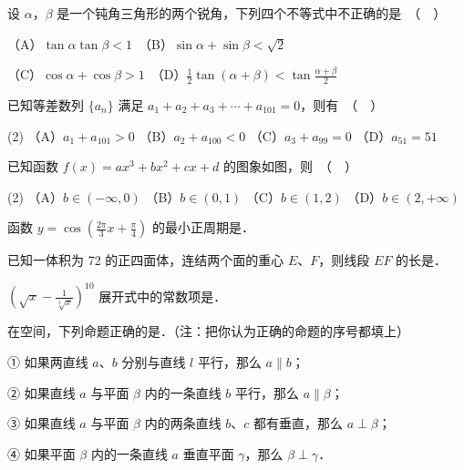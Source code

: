 \begin{question}
设 $\alpha$，$\beta$ 是一个钝角三角形的两个锐角，下列四个不等式中不正确的是　（　）

（A）$\tan\alpha \tan\beta < 1$　（B）$\sin\alpha + \sin\beta < \sqrt{2}$

（C）$\cos\alpha + \cos\beta > 1$　（D）$\frac{1}{2}\tan(\alpha+\beta) < \tan\frac{\alpha+\beta}{2}$

\end{question}
\begin{question}
已知等差数列 $\{a_n\}$ 满足 $a_1 + a_2 + a_3 + \cdots + a_{101} = 0$，则有　（　）

\begin{gkopts}(2)
\task （A）$a_1 + a_{101} > 0$
\task （B）$a_2 + a_{100} < 0$
\task （C）$a_3 + a_{99} = 0$
\task （D）$a_{51} = 51$
\end{gkopts}

\Needspace{0.4\textheight}
\end{question}
\begin{question}
已知函数 $f(x) = ax^3 + bx^2 + cx + d$ 的图象如图，则　（　）
\nopagebreak[4]
\begin{center}\end{center}
\nopagebreak[4]
\begin{gkopts}(2)
\task （A）$b \in (-\infty, 0)$
\task （B）$b \in (0, 1)$
\task （C）$b \in (1, 2)$
\task （D）$b \in (2, +\infty)$
\end{gkopts}

\end{question}

\begin{question}
函数 $y = \cos\left(\frac{2\pi}{3}x + \frac{\pi}{4}\right)$ 的最小正周期是\gkblank{}．

\end{question}
\begin{question}
已知一体积为 72 的正四面体，连结两个面的重心 $E$、$F$，则线段 $EF$ 的长是\gkblank{}．

\end{question}
\begin{question}
$\left(\sqrt{x} - \frac{1}{\sqrt[3]{x}}\right)^{10}$ 展开式中的常数项是\gkblank{}．

\end{question}
\begin{question}
在空间，下列命题正确的是\gkblank{}．（注：把你认为正确的命题的序号都填上）

① 如果两直线 $a$、$b$ 分别与直线 $l$ 平行，那么 $a \parallel b$；

② 如果直线 $a$ 与平面 $\beta$ 内的一条直线 $b$ 平行，那么 $a \parallel \beta$；

③ 如果直线 $a$ 与平面 $\beta$ 内的两条直线 $b$、$c$ 都有垂直，那么 $a \perp \beta$；

④ 如果平面 $\beta$ 内的一条直线 $a$ 垂直平面 $\gamma$，那么 $\beta \perp \gamma$．

\end{question}

